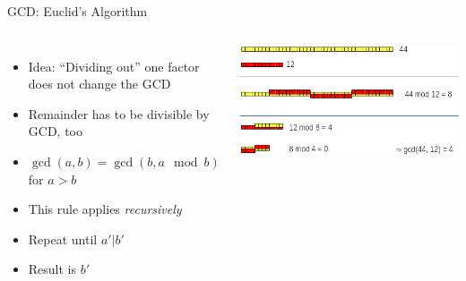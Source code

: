\begin{frame}{GCD: Euclid's Algorithm}
%
\begin{columns}
\begin{itemize}
\item Idea: \enquote{Dividing out} one factor does not change the GCD
\item Remainder has to be divisible by GCD, too
\item[\Thus] $\gcd(a, b) = \gcd(b, a \mod b)$ for $a > b$
\item This rule applies \emph{recursively}
\item[\Thus] Repeat until $a' | b'$
\item[\Thus] Result is $b'$
\end{itemize}
%
\includegraphics[width=\linewidth]{./gfx/Euclid-GCD}
\end{columns}
%
\end{frame}


